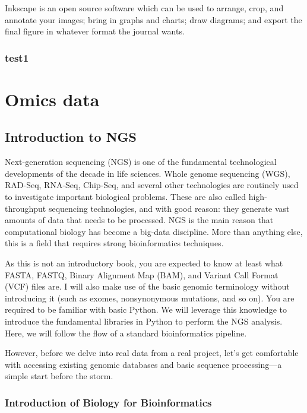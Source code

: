\documentclass[]{book}
\begin{document}
Inkscape is an open source software which can be used to arrange, crop, and annotate your images; bring in graphs and charts; draw diagrams; and export the final figure in whatever format the journal wants.

\hypertarget{test1}{%
\section{test1}\label{test1}}

\hypertarget{part-omics-data}{%
\part{Omics data}\label{part-omics-data}}

\hypertarget{introduction-to-ngs}{%
\chapter{Introduction to NGS}\label{introduction-to-ngs}}

Next-generation sequencing (NGS) is one of the fundamental technological developments of the decade in life sciences. Whole genome sequencing (WGS), RAD-Seq, RNA-Seq, Chip-Seq, and several other technologies are routinely used to investigate important biological problems. These are also called high-throughput sequencing technologies, and with good reason: they generate vast amounts of data that needs to be processed. NGS is the main reason that computational biology has become a big-data discipline. More than anything else, this is a field that requires strong bioinformatics techniques.

As this is not an introductory book, you are expected to know at least what FASTA, FASTQ, Binary Alignment Map (BAM), and Variant Call Format (VCF) files are. I will also make use of the basic genomic terminology without introducing it (such as exomes, nonsynonymous mutations, and so on). You are required to be familiar with basic Python. We will leverage this knowledge to introduce the fundamental libraries in Python to perform the NGS analysis. Here, we will follow the flow of a standard bioinformatics pipeline.

However, before we delve into real data from a real project, let's get comfortable with accessing existing genomic databases and basic sequence processing---a simple start before the storm.

\hypertarget{introduction-of-biology-for-bioinformatics}{%
\section{Introduction of Biology for Bioinformatics}\label{introduction-of-biology-for-bioinformatics}}
\end{document}
